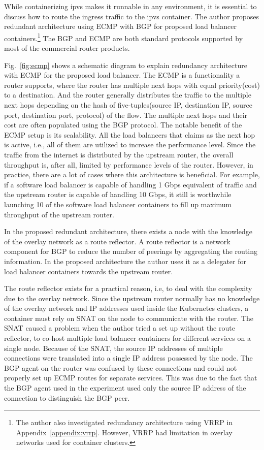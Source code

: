 While containerizing ipvs makes it runnable in any environment, it is essential to discuss how to route the ingress traffic to the ipvs container.
The author proposes redundant architecture using ECMP with BGP for proposed load balancer containers.\footnote{The author also investigated redundancy architecture using VRRP in Appendix~\ref{appendix:vrrp}. However, VRRP had limitation in overlay networks used for container clusters.}
The BGP and ECMP are both standard protocols supported by most of the commercial router products.

Fig.~\ref{fig:ecmp} shows a schematic diagram to explain redundancy architecture with ECMP for the proposed load balancer.
%
The ECMP is a functionality a router supports, where the router has multiple next hops with equal priority(cost) to a destination.
And the router generally distributes the traffic to the multiple next hops depending on the hash of five-tuples(source IP, destination IP, source port, destination port, protocol) of the flow.
The multiple next hops and their cost are often populated using the BGP protocol.
%
The notable benefit of the ECMP setup is its scalability.
All the load balancers that claims as the next hop is active, i.e., all of them are utilized to increase the performance level.
Since the traffic from the internet is distributed by the upstream router, the overall throughput is, after all, limited by performance levels of the router.
However, in practice, there are a lot of cases where this architecture is beneficial.
For example, if a software load balancer is capable of handling 1 Gbps equivalent of traffic and the upstream router is capable of handling 10 Gbps, it still is worthwhile launching 10 of the software load balancer containers to fill up maximum throughput of the upstream router.

%
In the proposed redundant architecture, there exists a node with the knowledge of the overlay network as a route reflector.
A route reflector is a network component for BGP to reduce the number of peerings by aggregating the routing information\cite{rfc4456}.
In the proposed architecture the author uses it as a delegater for load balancer containers towards the upstream router.

The route reflector exists for a practical reason, i.e, to deal with the complexity due to the overlay network.
Since the upstream router normally has no knowledge of the overlay network and IP addresses used inside the Kubernetes clusters, a container must rely on SNAT on the node to communicate with the router.
The SNAT caused a problem when the author tried a set up without the route reflector, to co-host multiple load balancer containers for different services on a single node.
Because of the SNAT, the source IP addresses of multiple connections were translated into a single IP address possessed by the node.
The BGP agent on the router was confused by these connections and could not properly set up ECMP routes for separate services.
This was due to the fact that the BGP agent used in the experiment used only the source IP address of the connection to distinguish the BGP peer.

